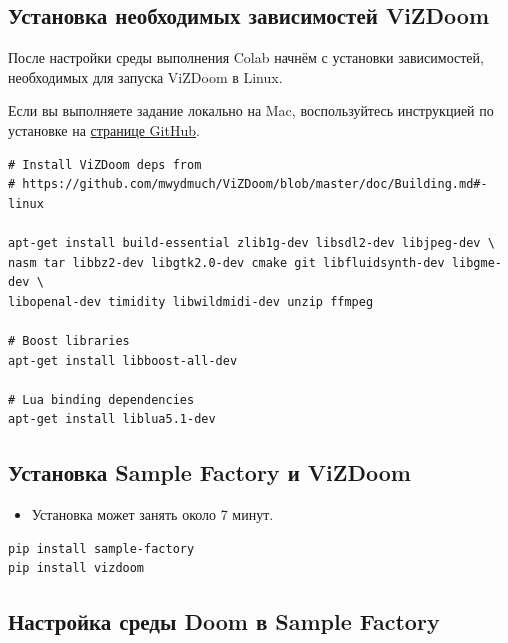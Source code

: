 \documentclass[11pt,a4paper]{article}
\begin{document}
\subsection{Установка необходимых зависимостей ViZDoom}\label{we-first-need-to-install-some-dependencies-that-are-required-for-the-vizdoom-environment}

После настройки среды выполнения Colab начнём с установки зависимостей, необходимых для запуска ViZDoom в Linux.

Если вы выполняете задание локально на Mac, воспользуйтесь инструкцией по установке на \href{https://github.com/Farama-Foundation/ViZDoom/blob/master/doc/Quickstart.md\#-quickstart-for-macos-and-anaconda3-python-36}{странице GitHub}.

\begin{lstlisting}
# Install ViZDoom deps from
# https://github.com/mwydmuch/ViZDoom/blob/master/doc/Building.md#-linux

apt-get install build-essential zlib1g-dev libsdl2-dev libjpeg-dev \
nasm tar libbz2-dev libgtk2.0-dev cmake git libfluidsynth-dev libgme-dev \
libopenal-dev timidity libwildmidi-dev unzip ffmpeg

# Boost libraries
apt-get install libboost-all-dev

# Lua binding dependencies
apt-get install liblua5.1-dev
\end{lstlisting}

\subsection{Установка Sample Factory и ViZDoom}\label{then-we-can-install-sample-factory-and-vizdoom}

\begin{itemize}
\tightlist
\item
  Установка может занять около 7 минут.
\end{itemize}

\begin{lstlisting}
pip install sample-factory
pip install vizdoom
\end{lstlisting}

\subsection{Настройка среды Doom в Sample Factory}\label{setting-up-the-doom-environment-in-sample-factory}
\end{document}
